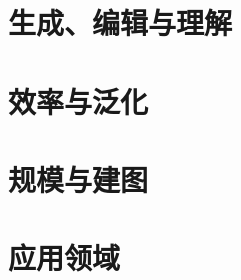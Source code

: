 



\part{生成、编辑与理解}







\part{效率与泛化}






\part{规模与建图}





\part{应用领域}











\backmatter



